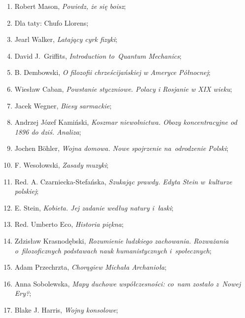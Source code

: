 \documentclass[a4paper,11pt]{article}
\begin{document}
\begin{enumerate}
\item Robert Mason, \textit{Powiedz, że się boisz};

\item Dla taty: Chufo Llorens;

\item Jearl Walker, \textit{Latający cyrk fizyki};

\item David J.~Griffits, \textit{Introduction to~Quantum Mechanics};

\item B. Dembowski, \textit{O filozofii chrześcijańskiej w Ameryce
    Północnej};

\item Wiesław Caban, \textit{Powstanie styczniowe. Polacy i Rosjanie w
    XIX wieku};

\item Jacek Wegner, \textit{Biesy sarmackie};

\item Andrzej Józef Kamiński, \textit{Koszmar niewolnictwa. Obozy
    koncentracyjne od 1896 do dziś. Analiza};

\item Jochen B\"{o}hler, \textit{Wojna domowa. Nowe spojrzenie
    na~odrodzenie Polski};

\item F. Wesołowski, \textit{Zasady muzyki};

\item Red. A. Czarniecka-Stefańska, \textit{Szukając prawdy. Edyta Stein
    w~kulturze polskiej};

\item E. Stein, \textit{Kobieta. Jej zadanie według natury i~łaski};

\item Red. Umberto Eco, \textit{Historia piękna};

\item Zdzisław Krasnodębski, \textit{Rozumienie ludzkiego zachowania.
    Rozważania o~filozoficznych podstawach nauk humanistycznych
    i~społecznych};

\item Adam Przechrzta, \textit{Chorągiew Michała Archanioła};

\item Anna Sobolewska, \textit{Mapy duchowe współczesności: co~nam
    zostało z~Nowej Ery?};

\item Blake J. Harris, \textit{Wojny konsolowe};


\end{enumerate}
\end{document}
